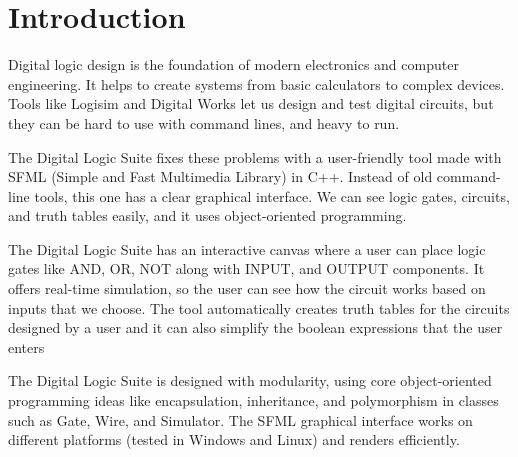 \section{Introduction}
Digital logic design is the foundation of modern electronics and computer engineering. It helps to create systems from basic calculators to complex devices. Tools like Logisim and Digital Works let us design and test digital circuits, but they can be hard to use with command lines, and heavy to run.

\vspace{0.5cm}
The Digital Logic Suite fixes these problems with a user-friendly tool made with SFML (Simple and Fast Multimedia Library) in C++. Instead of old command-line tools, this one has a clear graphical interface. We can see logic gates, circuits, and truth tables easily, and it uses object-oriented programming.

\vspace{0.5cm}
The Digital Logic Suite has an interactive canvas where a user can place logic gates like AND, OR, NOT along with INPUT, and OUTPUT components. It offers real-time simulation, so the user can see how the circuit works based on inputs that we choose. The tool automatically creates truth tables for the circuits designed by a user and it can also simplify the boolean expressions that the user enters

\vspace{0.5cm}
The Digital Logic Suite is designed with modularity, using core object-oriented programming ideas like encapsulation, inheritance, and polymorphism in classes such as Gate, Wire, and Simulator. The SFML graphical interface works on different platforms (tested in Windows and Linux) and renders efficiently.
\clearpage